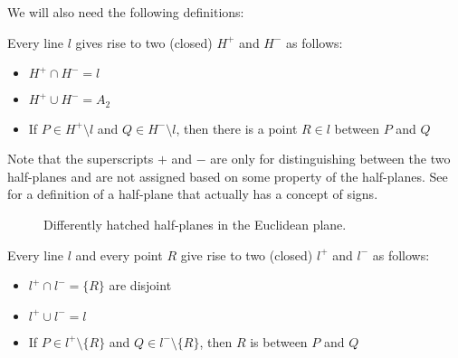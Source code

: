 \begin{definition}\label{def:euclidean_plane_auxiliary_definitions}
  We will also need the following definitions:
  \begin{thmenum}
     Every line \( l \) gives rise to two (closed)  \( H^+ \) and \( H^- \) as follows:
    \begin{itemize}
      \item \( H^+ \cap H^- = l \)
      \item \( H^+ \cup H^- = A_2 \)
      \item If \( P \in H^+ \setminus l \) and \( Q \in H^- \setminus l \), then there is a point \( R \in l \) between \( P \) and \( Q \)
    \end{itemize}

    Note that the superscripts \( + \) and \( - \) are only for distinguishing between the two half-planes and are not assigned based on some property of the half-planes. See  for a definition of a half-plane that actually has a concept of signs.

    \begin{figure}[!ht]
      \centering
      \iffalse\begin{mplibcode}
        input metapost/plotting;

        u := 1cm;

        beginfig(1);
        input hatching;

        path l, Hp, Hm;
        l = (0, -1) * u -- (3, 0) * u;
        draw l;

        Hp = l -- (3, 0.5) * u -- (0, 0.5) * u -- cycle;
        hatchfill Hp withcolor (45, 1mm, -.5bp);
        label.ulft("$H^+$", startpoint of l);

        Hm = l -- (3, -1.5) * u -- (0, -1.5) * u -- cycle;
        hatchfill Hm withcolor (135, 1mm, -.5bp);
        label.lrt("$H^-$", endpoint of l);
        endfig;
      \end{mplibcode}\fi

      \caption{Differently hatched half-planes in the Euclidean plane.}\label{def:affine_plane/bound_vector/half_plane}
    \end{figure}

     Every line \( l \) and every point \( R \) give rise to two (closed)  \( l^+ \) and \( l^- \) as follows:
    \begin{itemize}
      \item \( l^+ \cap l^- = \{ R \} \) are disjoint
      \item \( l^+ \cup l^- = l \)
      \item If \( P \in l^+ \setminus \{ R \} \) and \( Q \in l^- \setminus \{ R \} \), then \( R \) is between \( P \) and \( Q \)
    \end{itemize}


\end{thmenum}
\end{definition}
